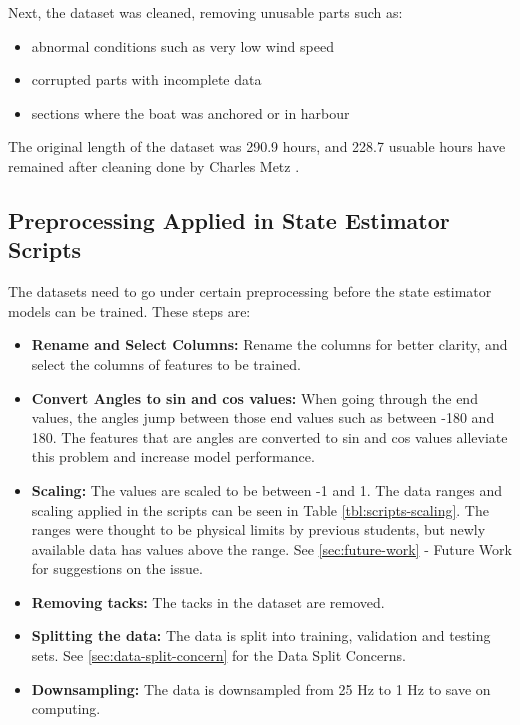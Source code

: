 \documentclass[12pt,twoside]{report}
\begin{document}
Next, the dataset was cleaned, removing unusable parts such as:
\begin{itemize}
    \item abnormal conditions such as very low wind speed
    \item corrupted parts with incomplete data
    \item sections where the boat was anchored or in harbour
\end{itemize}

The original length of the dataset was 290.9 hours, and 228.7 usuable hours have remained after cleaning done by Charles Metz \cite{charles}.

\subsection{Preprocessing Applied in State Estimator Scripts}
The datasets need to go under certain preprocessing before the state estimator models can be trained. These steps are:

\begin{itemize}
    \item \textbf{Rename and Select Columns:} Rename the columns for better clarity, and select the columns of features to be trained.
    \item \textbf{Convert Angles to sin and cos values:} When going through the end values, the angles jump between those end values such as between -180 and 180. The features that are angles are converted to sin and cos values alleviate this problem and increase model performance.
    \item \textbf{Scaling:} The values are scaled to be between -1 and 1. The data ranges and scaling applied in the scripts can be seen in Table \ref{tbl:scripts-scaling}. The ranges were thought to be physical limits by previous students, but newly available data has values above the range. See \ref{sec:future-work} - Future Work for suggestions on the issue.
    \item \textbf{Removing tacks:} The tacks in the dataset are removed.
    \item \textbf{Splitting the data:} The data is split into training, validation and testing sets. See \ref{sec:data-split-concern} for the Data Split Concerns.
    \item \textbf{Downsampling:} The data is downsampled from 25 Hz to 1 Hz to save on computing.
\end{itemize}
\end{document}
